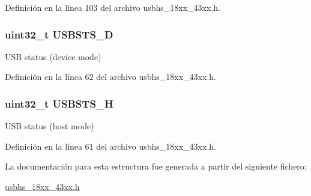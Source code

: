 Definición en la línea 103 del archivo usbhs\+\_\+18xx\+\_\+43xx.\+h.

\subsubsection[{\texorpdfstring{U\+S\+B\+S\+T\+S\+\_\+D}{USBSTS_D}}]{ uint32\+\_\+t U\+S\+B\+S\+T\+S\+\_\+D}\hypertarget{struct_l_p_c___u_s_b_h_s___t_a0753b65b5d34850997d44e38edf3444f}{}\label{struct_l_p_c___u_s_b_h_s___t_a0753b65b5d34850997d44e38edf3444f}
U\+SB status (device mode) 

Definición en la línea 62 del archivo usbhs\+\_\+18xx\+\_\+43xx.\+h.

\subsubsection[{\texorpdfstring{U\+S\+B\+S\+T\+S\+\_\+H}{USBSTS_H}}]{ uint32\+\_\+t U\+S\+B\+S\+T\+S\+\_\+H}\hypertarget{struct_l_p_c___u_s_b_h_s___t_abebf0c674a65b6bd7e9d2f4565bcc04c}{}\label{struct_l_p_c___u_s_b_h_s___t_abebf0c674a65b6bd7e9d2f4565bcc04c}
U\+SB status (host mode) 

Definición en la línea 61 del archivo usbhs\+\_\+18xx\+\_\+43xx.\+h.



La documentación para esta estructura fue generada a partir del siguiente fichero\+:\begin{DoxyCompactItemize}
\item 
\hyperlink{usbhs__18xx__43xx_8h}{usbhs\+\_\+18xx\+\_\+43xx.\+h}\end{DoxyCompactItemize}
